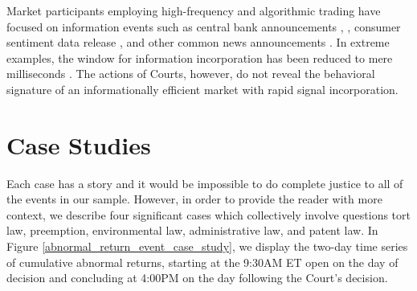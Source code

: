 \documentclass[preprint,12pt]{elsarticle}
\begin{document}
Market participants employing high-frequency and algorithmic trading have focused on information events such as central bank announcements  \cite{bernanke2005explains}, \cite{jansen2007were}, consumer sentiment data release \cite{akhtar2012stock}, and other common news announcements \cite{gross2011machines} \cite{schumaker2009quantitative}. In extreme examples, the window for information incorporation has been reduced to mere milliseconds \cite{scholtus2014speed}.  The actions of Courts, however, do not reveal the behavioral signature of an informationally efficient market with rapid signal incorporation.  

\section{Case Studies}
\label{S:5}
Each case has a story and it would be impossible to do complete justice to all of the events in our sample.  However, in order to provide the reader with more context, we describe four significant cases which collectively involve questions tort law, preemption, environmental law, administrative law, and patent law. In Figure \ref{abnormal_return_event_case_study}, we display the two-day time series of cumulative abnormal returns, starting at the 9:30AM ET open on the day of decision and concluding at 4:00PM on the day following the Court's decision.
\end{document}

